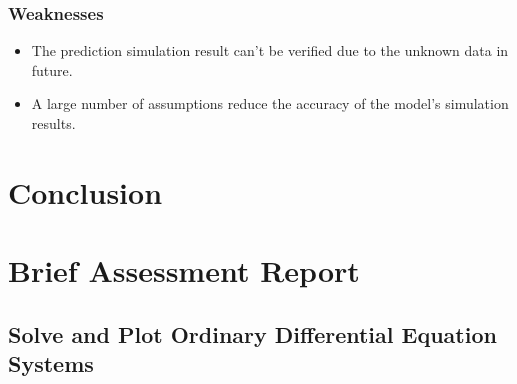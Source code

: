\documentclass{mcmthesis}
\begin{document}
\subsubsection{Weaknesses}
\begin{itemize}
	\item The prediction simulation result can't be verified due to the unknown data in future.  
	\item A large number of assumptions reduce the accuracy of the model’s simulation results.
\end{itemize}


\section{Conclusion}\label{S8}


\newpage





\section*{Brief Assessment Report}\label{S9}

\newpage

\begin{appendices}

\section{Solve and Plot Ordinary Differential Equation Systems}


\end{appendices}


\newpage



    
    
\end{document}
